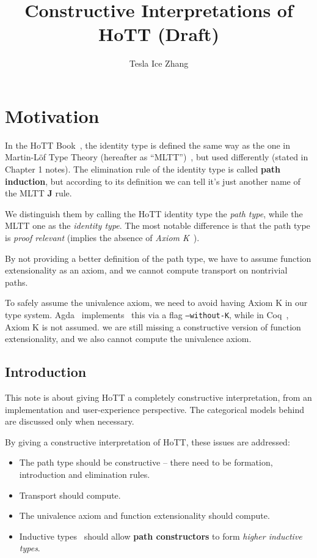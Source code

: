 \documentclass{article}
\title{Constructive Interpretations of HoTT (Draft)}
\author{Tesla Ice Zhang}
\begin{document}
\maketitle

\tableofcontents

\section{Motivation}

In the HoTT Book~\cite{hottbook},
the identity type is defined the same way as the one
in Martin-L\"{o}f Type Theory (hereafter as ``MLTT'')~\cite{MLTT},
but used differently (stated in Chapter 1 notes).
The elimination rule of the identity type is called \textbf{path induction},
but according to its definition we can tell
it's just another name of the MLTT \textbf J rule.

We distinguish them by calling the HoTT identity type the \textit{path type},
while the MLTT one as the \textit{identity type}.
The most notable difference is that the path type is
\textit{proof relevant} (implies the absence of
\textit{Axiom K}~\cite{AxiomK}).

By not providing a better definition of the path type,
we have to assume function extensionality as an axiom,
and we cannot compute transport on nontrivial paths.

To safely assume the univalence axiom, we need to avoid having Axiom K
in our type system.
Agda~\cite{Agda} implements~\cite{WithoutK} this via a flag \texttt{--without-K},
while in Coq~\cite{Coq}, Axiom K is not assumed.
we are still missing a constructive version of function extensionality,
and we also cannot compute the univalence axiom.

\subsection{Introduction}

This note is about giving HoTT a completely constructive interpretation,
from an implementation and user-experience perspective.
The categorical models behind are discussed only when necessary.

By giving a constructive interpretation of HoTT,
these issues are addressed:

\begin{itemize}
\item The path type should be constructive --
  there need to be formation, introduction and elimination rules.
\item Transport should compute.
\item The univalence axiom and function extensionality should compute.
\item Inductive types~\cite{Inductive} should allow \textbf{path constructors}
  to form \textit{higher inductive types}.
\end{itemize}
\end{document}
